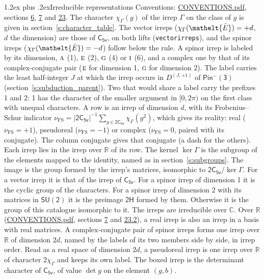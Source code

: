 \documentclass[10pt,a4paper]{article}
\makeatletter
\renewcommand\section{\@startsection{section}{1}{\z@}{-3ex plus -1ex minus -.2ex}%
  {1.2ex plus .2ex}{\normalfont\large\sffamily\bfseries\color{parttitle}}}
\numberwithin{equation}{section}
\newcommand{\eltfont}[1]{{\let\sigma\eltsigma\mathelt{#1}}}
\newcommand{\grp}[1]{\mathsf{#1}}
\newcommand{\irr}[1]{\text{\normalfont\scshape #1}}
\newcommand{\elt}[1]{\eltfont{#1}}
\newcommand{\irrJp}[2]{D^{(#1,#2)}}
\newcommand{\irchar}[1]{\chi_{#1}}
\newcommand{\fsind}{\nu_{\mathrm{FS}}}
\newcommand{\barred}[1]{\bar{#1}}
\makeatother
\begin{document}
\section{Irreducible representations}\label{s:irreps}
Conventions: \href{../../CONVENTIONS.pdf}{CONVENTIONS.pdf}, sections \href{../../../rotation/CONVENTIONS.pdf\#conv.6}{6}, \href{../../../rotation/CONVENTIONS.pdf\#conv.7}{7} and \href{../../CONVENTIONS.pdf\#conv.23}{23}.
\leavevmode\label{n:function.character}\label{n:irrep.Gamma}The character $\irchar{\Gamma}(g)$ of the irrep $\Gamma$ on the class of $g$ is given in section~\ref{s:character_table}. \label{n:index.dimension}The vector irreps ($\irchar{\Gamma}(\elt{\barred{E}}) = +d$, $d$ the dimension) are those of \href{../../../rotation/data/pdf/C5v.pdf}{$\grp{C_{5v}}$}, on both lifts (\texttt{vectorirreps}), and the spinor irreps ($\irchar{\Gamma}(\elt{\barred{E}}) = -d$) follow below the rule. A spinor irrep is labeled by its dimension, $\irr{a}$ (1), $\irr{e}$ (2), $\irr{g}$ (4) or $\irr{i}$ (6), and a complex one by that of its complex-conjugate pair ($\irr{e}$ for dimension 1, $\irr{g}$ for dimension 2). The label carries the least half-integer $J$ at which the irrep occurs in $\irrJp{J}{+1}$ of $\grp{Pin^{-}(3)}$ (section~\ref{s:subduction_parent}). Two that would share a label carry the prefixes 1 and 2: 1 has the character of the smaller argument in $[0, 2\pi)$ on the first class with unequal characters.
\leavevmode\label{n:index.frobenius}\label{n:head.irrep}\label{n:head.reality}A row is an irrep of dimension $d$, with its Frobenius--Schur indicator $\fsind = |\grp{2C_{5v}}|^{-1}\allowbreak\sum_{g\in\grp{2C_{5v}}}\irchar{\Gamma}(g^2)$, which gives its reality: real ($\fsind = +1$), pseudoreal ($\fsind = -1$) or complex ($\fsind = 0$, paired with its conjugate). \label{n:head.conjugate}The column conjugate gives that conjugate (a dash for the others). \label{n:head.over.real}Each irrep lies in the irrep over $\mathbb{R}$ of its row. \label{n:head.kernel}The kernel $\ker\Gamma$ is the subgroup of the elements mapped to the identity, named as in section~\ref{s:subgroups}. \label{n:head.image}The image is the group formed by the irrep's matrices, isomorphic to $\grp{2C_{5v}}/\ker\Gamma$. For a vector irrep it is that of the irrep of \href{../../../rotation/data/pdf/C5v.pdf}{$\grp{C_{5v}}$}. For a spinor irrep of dimension 1 it is the cyclic group of the characters. For a spinor irrep of dimension 2 with its matrices in $\grp{SU(2)}$ it is the preimage $\grp{2H}$ formed by them. Otherwise it is the group of this catalogue isomorphic to it. The irreps are irreducible over $\mathbb{C}$. Over $\mathbb{R}$ (\href{../../CONVENTIONS.pdf}{CONVENTIONS.pdf}, sections \href{../../../rotation/CONVENTIONS.pdf\#conv.7}{7} and \href{../../CONVENTIONS.pdf\#conv.23.2}{23.2}), a real irrep is also an irrep in a basis with real matrices. A complex-conjugate pair of spinor irreps forms one irrep over $\mathbb{R}$ of dimension $2d$, named by the labels of its two members side by side, in irrep order. Read as a real space of dimension $2d$, a pseudoreal irrep is one irrep over $\mathbb{R}$ of character $2\irchar{\Gamma}$ and keeps its own label. \label{n:mark.determinant}The boxed irrep is the determinant character of \href{../../../rotation/data/pdf/C5v.pdf}{$\grp{C_{5v}}$}, of value $\det g$ on the element $(g, b)$.
\end{document}
